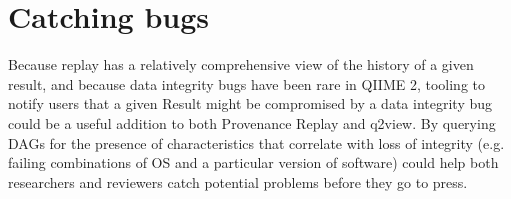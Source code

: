 \section{Catching bugs}
Because replay has a relatively comprehensive view of the history of a given
result, and because data integrity bugs have been rare in QIIME 2, tooling to
notify users that a given Result might be compromised by a data integrity bug
could be a useful addition to both Provenance Replay and q2view. By querying
DAGs for the presence of characteristics that correlate with loss of integrity
(e.g. failing combinations of OS and a particular version of software) could
help both researchers and reviewers catch potential problems before they go to
press.

